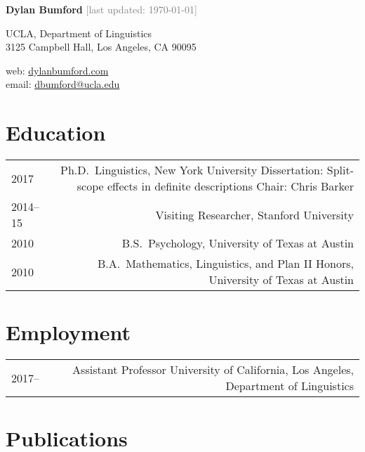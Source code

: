 \documentclass[12pt]{article}
\newcommand{\refmark}{\textcolor{gray}{\textdagger}}
\begin{document}
\textbf{Dylan Bumford}\hfill
\textcolor{gray}{[last updated: \today]}

\bigskip

\begin{minipage}[t]{0.55\textwidth}
UCLA, Department of Linguistics\\
3125 Campbell Hall, Los Angeles, CA 90095
\end{minipage}
\begin{minipage}[t]{\linegoal}
\raggedleft%
web: \url{dylanbumford.com}\\
email: \href{mailto:dbumford@ucla.edu}{dbumford@ucla.edu}
\end{minipage}

\bigskip
\bigskip

\section*{Education}

\begin{longtable}{LR}
  2017        & Ph.D.~Linguistics, New York University\newline
                Dissertation: Split-scope effects in definite descriptions\newline
                Chair: Chris Barker
                \\
  2014--15    & Visiting Researcher, Stanford University\\
  2010        & B.S.~Psychology, University of Texas at Austin\\
  2010        & B.A.~Mathematics, Linguistics, and Plan II Honors, University of
                Texas at Austin
\end{longtable}

\medskip

\section*{Employment}

\begin{longtable}{LR}
  2017--    & Assistant Professor\newline
              University of California, Los Angeles, Department of Linguistics
\end{longtable}

\medskip

\section*{Publications \
  \NoCaseChange{\normalsize\mdseries\color{gray} (\refmark\ $=$\
    journal article)}
}
\end{document}

